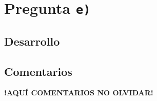 \section{Pregunta \texttt{e)}}\label{pregunta-e}

\subsection{Desarrollo}



\FloatBarrier
\subsection{Comentarios}


\textbf{!AQUÍ COMENTARIOS NO OLVIDAR!}